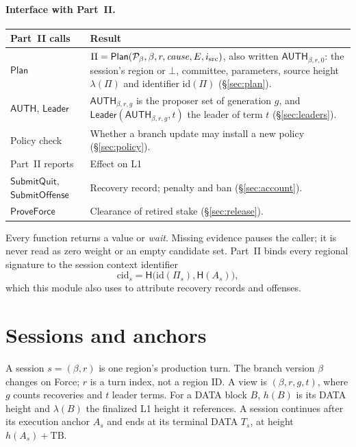 \documentclass[11pt,a4paper]{article}
\newcommand{\Hash}{\mathsf H}
\newcommand{\tagg}[1]{\mathsf{#1}}
\newcommand{\cid}{\mathrm{cid}}
\begin{document}
\paragraph{Interface with Part~II.}\leavevmode\par
\begin{tabularx}{\linewidth}{@{}>{\raggedright\arraybackslash}p{.22\linewidth}Y@{}}\toprule
Part~II calls & Result\\\midrule
$\tagg{Plan}$ & $\Pi=\tagg{Plan}(\mathcal P_\beta,\beta,r,\mathit{cause},E,i_{\rm src})$,
also written $\tagg{AUTH}_{\beta,r,0}$: the session's region or $\bot$,
committee, parameters, source height $\lambda(\Pi)$ and identifier
$\mathrm{id}(\Pi)$ (\S\ref{sec:plan}).\\
$\tagg{AUTH}$, $\tagg{Leader}$ & $\tagg{AUTH}_{\beta,r,g}$ is the proposer set
of generation $g$, and $\tagg{Leader}(\tagg{AUTH}_{\beta,r,g},t)$ the leader
of term $t$ (\S\ref{sec:leaders}).\\
Policy check & Whether a branch update may install a new policy
(\S\ref{sec:policy}).\\\midrule
Part~II reports & Effect on L1\\\midrule
$\tagg{SubmitQuit}$, $\tagg{SubmitOffense}$ & Recovery record; penalty and
ban (\S\ref{sec:account}).\\
$\tagg{ProveForce}$ & Clearance of retired stake (\S\ref{sec:release}).\\\bottomrule
\end{tabularx}

Every function returns a value or \emph{wait}. Missing evidence pauses
the caller; it is never read as zero weight or an empty candidate set.
Part~II binds every regional signature to the session context identifier
\[
 \cid_s=\Hash\bigl(\mathrm{id}(\Pi_s),\Hash(A_s)\bigr),
\]
which this module also uses to attribute recovery records and offenses.

\section{Sessions and anchors}
\label{sec:anchors}
A session $s=(\beta,r)$ is one region's production turn. The branch
version $\beta$ changes on Force; $r$ is a turn index, not a region ID. A
view is $(\beta,r,g,t)$, where $g$ counts recoveries and $t$ leader terms.
For a DATA block $B$, $h(B)$ is its DATA height and $\lambda(B)$ the
finalized L1 height it references. A session continues after its
execution anchor $A_s$ and ends at its terminal DATA $T_s$, at height
$h(A_s)+\mathrm{TB}$.
\end{document}

